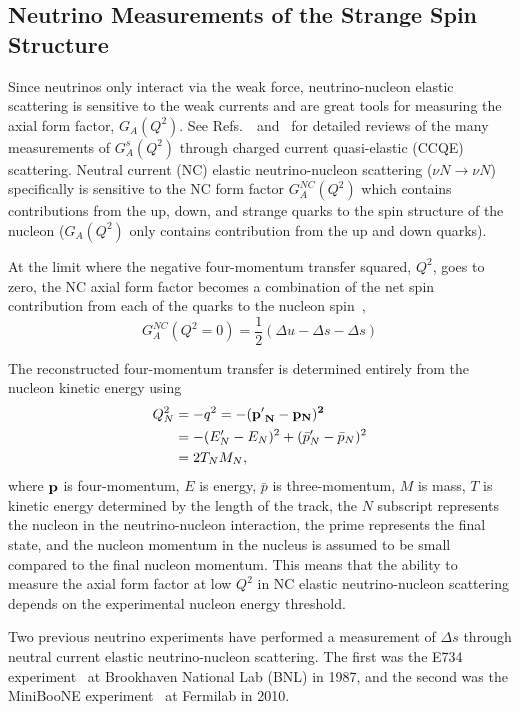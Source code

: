 \subsection{Neutrino Measurements of the Strange Spin Structure}
\label{sec:neutrinos}
  Since neutrinos only interact via the weak force, neutrino-nucleon elastic
  scattering is sensitive to the weak currents and are great tools for
  measuring the axial form factor, $G_A(Q^2)$.
  See Refs.~\cite{Lyubushkin:2008pe}~and~\cite{Formaggio:2013kya} for detailed
  reviews of the many measurements of $G_A^s(Q^2)$ through charged current
  quasi-elastic (CCQE) scattering. Neutral current (NC) elastic
  neutrino-nucleon scattering ($\nu N \rightarrow \nu N$) specifically is
  sensitive to the NC form factor $G_A^{NC}(Q^2)$ which contains
  contributions from the up, down, and strange quarks to the spin structure
  of the nucleon ($G_A(Q^2)$ only contains contribution from the up and down
  quarks).

  At the limit where the negative four-momentum transfer squared, $Q^2$, goes
  to zero, the NC axial form factor becomes a combination of the net spin
  contribution from each of the quarks to the nucleon spin~\cite{Bass:2007zzb},
  \begin{equation*}
    G_A^{NC}(Q^2 = 0) = \frac{1}{2}(\Delta u - \Delta s - \Delta s)
  \end{equation*}

  The reconstructed four-momentum transfer is
  determined entirely from the nucleon kinetic energy using
  \begin{align*}
    Q^2_N &= -q^2 = -(\bf{p'}_N - \bf{p}_N)^2 \\
          &= -(E'_N - E_N)^2 + (\bar{p}'_N - \bar{p}_N)^2 \\
          &= 2 T_N M_N,
  \end{align*}
  where $\bf{p}$ is four-momentum, $E$ is energy, $\bar{p}$ is
  three-momentum, $M$ is mass, $T$ is kinetic energy determined by the length
  of the track, the $N$ subscript represents the nucleon in the
  neutrino-nucleon interaction, the prime represents the final state, and the
  nucleon momentum in the nucleus is assumed to be small compared to the
  final nucleon momentum. This means that the ability to measure the axial
  form factor at low $Q^2$ in NC elastic neutrino-nucleon scattering depends
  on the experimental nucleon energy threshold.

  Two previous neutrino experiments have performed a measurement of $\Delta
  s$ through neutral current elastic neutrino-nucleon scattering. The first
  was the E734 experiment~\cite{Ahrens:1986xe} at Brookhaven National Lab (BNL) in
  1987, and the second was the MiniBooNE experiment~\cite{Aguilar-Arevalo:2010cx} at
  Fermilab in 2010.

